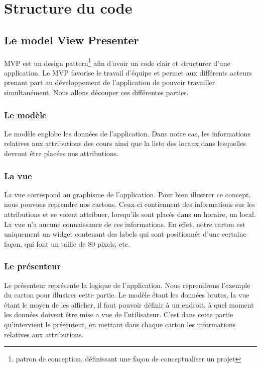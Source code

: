 
\chapter{Structure du code}

\section{Le model View Presenter}
MVP est un design pattern\footnote{patron de conception, définissant une façon de conceptualiser un projet} afin d'avoir un code clair et structurer d'une application. Le MVP favorise le travail d'équipe et permet aux différents acteurs prenant part au développement de l'application de pouvoir travailler simultanément. Nous allons découper ces différentes parties.

\subsection{Le modèle}
Le modèle englobe les données de l'application. Dans notre cas, les informations relatives aux attributions des cours ainsi que la liste des locaux dans lesquelles devront être placées nos attributions.

\subsection{La vue}
La vue correspond au graphisme de l'application. Pour bien illustrer ce concept, nous pouvons reprendre nos cartons. Ceux-ci contiennent des informations sur les attributions et se voient attribuer, lorsqu'ils sont placés dans un horaire, un local. La vue n'a aucune connaissance de ces informations. En effet, notre carton est uniquement un widget contenant des labels qui  sont positionnés d'une certaine façon, qui font un taille de 80 pixels, etc. 

\subsection{Le présenteur}
Le présenteur représente la logique de l'application. Nous reprendrons l'exemple du carton pour illustrer cette partie. Le modèle étant les données brutes, la vue étant le moyen de les afficher, il faut pouvoir définir à un endroit, à quel moment les données doivent être mise a vue de l'utilisateur. C'est dans cette partie qu'intervient le présenteur, en mettant dans chaque carton les informations relatives aux attributions.
 
